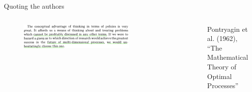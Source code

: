 \documentclass[aspectratio=169]{beamer}
\begin{document}
\begin{frame}{Quoting the authors}
\begin{columns}
\begin{figure}[h]
\includegraphics[width=.9\columnwidth]{figures/bellman_quote_3.png}
\end{figure}
\begin{columns}
\begin{figure}
\includegraphics[width=\columnwidth]{figures/pontryagin.jpg}
\end{figure}
Pontryagin et al. (1962), \\
``The Mathematical Theory of Optimal Processes'' 
\end{columns}


\end{columns}
\end{frame}
\end{document}
